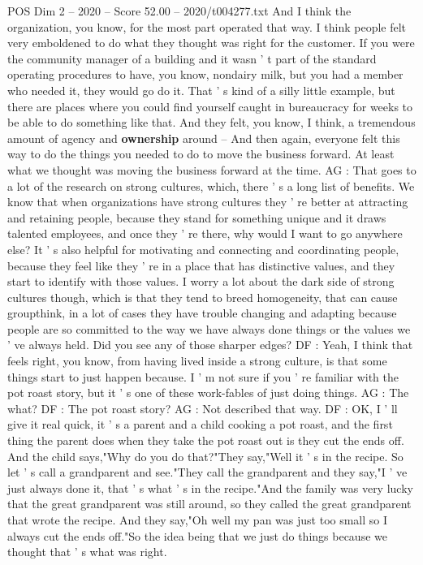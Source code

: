 \begin{textsample}{POS Dim 2 – 2020 – Score 52.00 – 2020/t004277.txt}
And I think the organization, you know, for the most part operated that way.
I think people felt very emboldened to do what they thought was right for the customer.
If you were the community manager of a building and it wasn ' t part of the standard operating procedures to have, you know, nondairy milk, but you had a member who needed it, they would go do it.
That ' s kind of a silly little example, but there are places where you could find yourself caught in bureaucracy for weeks to be able to do something like that.
And they felt, you know, I think, a tremendous amount of agency and \textbf{ownership} around -- And then again, everyone felt this way to do the things you needed to do to move the business forward.
At least what we thought was moving the business forward at the time.
AG : That goes to a lot of the research on strong cultures, which, there ' s a long list of benefits.
We know that when organizations have strong cultures they ' re better at attracting and retaining people, because they stand for something unique and it draws talented employees, and once they ' re there, why would I want to go anywhere else?
It ' s also helpful for motivating and connecting and coordinating people, because they feel like they ' re in a place that has distinctive values, and they start to identify with those values.
I worry a lot about the dark side of strong cultures though, which is that they tend to breed homogeneity, that can cause groupthink, in a lot of cases they have trouble changing and adapting because people are so committed to the way we have always done things or the values we ' ve always held.
Did you see any of those sharper edges?
DF : Yeah, I think that feels right, you know, from having lived inside a strong culture, is that some things start to just happen because.
I ' m not sure if you ' re familiar with the pot roast story, but it ' s one of these work-fables of just doing things.
AG : The what?
DF : The pot roast story?
AG : Not described that way.
DF : OK, I ' ll give it real quick, it ' s a parent and a child cooking a pot roast, and the first thing the parent does when they take the pot roast out is they cut the ends off.
And the child says,"Why do you do that?"They say,"Well it ' s in the recipe.
So let ' s call a grandparent and see."They call the grandparent and they say,"I ' ve just always done it, that ' s what ' s in the recipe."And the family was very lucky that the great grandparent was still around, so they called the great grandparent that wrote the recipe.
And they say,"Oh well my pan was just too small so I always cut the ends off."So the idea being that we just do things because we thought that ' s what was right.

\end{textsample}
